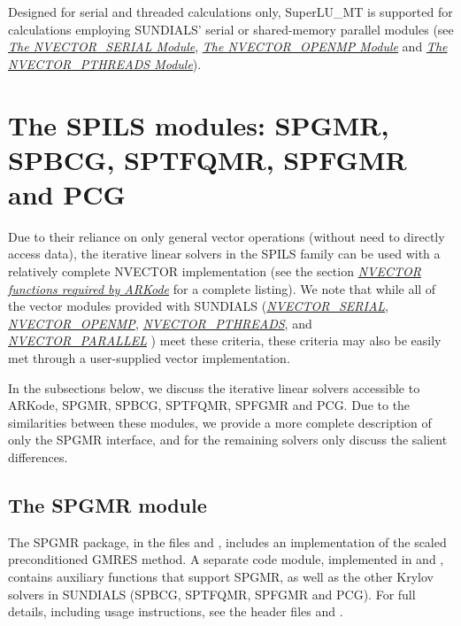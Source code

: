 \documentclass[letterpaper,10pt,english]{sphinxmanual}
\begin{document}
Designed for serial and threaded calculations only, SuperLU\_MT is
supported for calculations employing SUNDIALS' serial or shared-memory
parallel  modules (see {\hyperref[nvectors/NVector_Serial:nvectors-nvserial]{\emph{The NVECTOR\_SERIAL Module}}},
{\hyperref[nvectors/NVector_OpenMP:nvectors-openmp]{\emph{The NVECTOR\_OPENMP Module}}} and {\hyperref[nvectors/NVector_Pthreads:nvectors-pthreads]{\emph{The NVECTOR\_PTHREADS Module}}}).


\section{The SPILS modules: SPGMR, SPBCG, SPTFQMR, SPFGMR and PCG}
\label{linear_solvers/SPILS:the-spils-modules-spgmr-spbcg-sptfqmr-spfgmr-and-pcg}\label{linear_solvers/SPILS:linearsolvers-spils}\label{linear_solvers/SPILS::doc}
Due to their reliance on only general vector operations (without need
to directly access data), the iterative linear solvers in the SPILS
family can be used with a relatively complete NVECTOR implementation
(see the section {\hyperref[nvectors/ARKode_requirements:nvectors-arkode]{\emph{NVECTOR functions required by ARKode}}} for a complete listing).
We note that while all of the vector modules provided with SUNDIALS
({\hyperref[nvectors/NVector_Serial:nvectors-nvserial]{\emph{NVECTOR\_SERIAL}}}, {\hyperref[nvectors/NVector_OpenMP:nvectors-openmp]{\emph{NVECTOR\_OPENMP}}}, {\hyperref[nvectors/NVector_Pthreads:nvectors-pthreads]{\emph{NVECTOR\_PTHREADS}}}, and
{\hyperref[nvectors/NVector_Parallel:nvectors-nvparallel]{\emph{NVECTOR\_PARALLEL}}} )
meet these criteria, these criteria may also be easily met
through a user-supplied vector implementation.

In the subsections below, we discuss the iterative linear solvers
accessible to ARKode, SPGMR, SPBCG, SPTFQMR, SPFGMR and PCG.  Due to
the similarities between these modules, we provide a more complete
description of only the SPGMR interface, and for the remaining solvers
only discuss the salient differences.


\subsection{The SPGMR module}
\label{linear_solvers/SPILS:the-spgmr-module}
The SPGMR package, in the files  and
, includes an implementation of the scaled
preconditioned GMRES method.  A separate code module, implemented in
 and , contains
auxiliary functions that support SPGMR, as well as the other Krylov
solvers in SUNDIALS (SPBCG, SPTFQMR, SPFGMR and PCG).  For full
details, including usage instructions, see the header files
 and .
\end{document}
